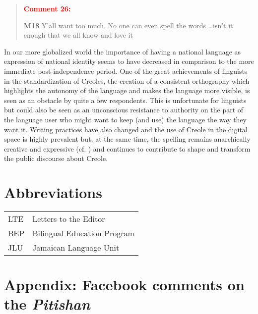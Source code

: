 \documentclass[output=paper,colorlinks,citecolor=brown]{langscibook}
\begin{document}
\begin{quote}
\textcolor[HTML]{FF0000}{\textbf{Comment 26:}}

\textbf{M18} Y'all want too much. No one can even spell the words \ldots isn't it enough that we all know and love it
\end{quote}

In our more globalized world the importance of having a national language as expression of national identity seems to have decreased in comparison to the more immediate post-independence period. One of the great achievements of linguists in the standardization of Creoles, the creation of a consistent orthography which highlights the autonomy of the language and makes the language more visible, is seen as an obstacle by quite a few respondents. This is unfortunate for linguists but could also be seen as an unconscious resistance to authority on the part of the language user who might want to keep (and use) the language the way they want it. Writing practices have also changed and the use of Creole in the digital space is highly prevalent but, at the same time, the spelling remains anarchically creative and expressive (cf. \citealt{moll2017diasporic}) and continues to contribute to shape and transform the public discourse about Creole.


\section*{Abbreviations}
\begin{tabularx}{.5\textwidth}{@{}lQ}
\textsc{LTE} & Letters to the Editor\\
\textsc {BEP} & Bilingual Education Program \\
\textsc{JLU} & Jamaican Language Unit\\
\end{tabularx}


\printbibliography[heading=subbibliography,notkeyword=this]


\newpage
\section*{Appendix: Facebook comments on the \textit{Pitishan}}
\small
\end{document}
